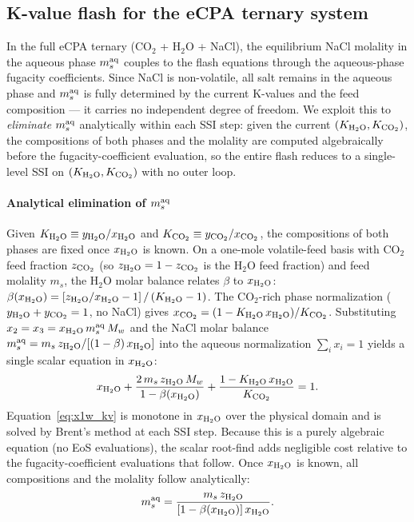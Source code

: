 \documentclass[preprint,12pt,number]{elsarticle}
\begin{document}
\subsection{K-value flash for the eCPA ternary system}
\label{sec:kv_flash}

In the full eCPA ternary (CO$_2$ + H$_2$O + NaCl), the equilibrium NaCl molality
in the aqueous phase $m_s^{\rm aq}$ couples to the flash equations through the
aqueous-phase fugacity coefficients.
Since NaCl is non-volatile, all salt remains in the aqueous phase and
$m_s^{\rm aq}$ is fully determined by the current K-values and the feed
composition — it carries no independent degree of freedom.
We exploit this to \emph{eliminate} $m_s^{\rm aq}$ analytically within each
SSI step: given the current $(K_{\rm H_2O}, K_{\rm CO_2})$, the compositions of both phases and
the molality are computed algebraically before the fugacity-coefficient
evaluation, so the entire flash reduces to a single-level SSI on $(K_{\rm H_2O}, K_{\rm CO_2})$
with no outer loop.

\paragraph{Analytical elimination of $m_s^{\rm aq}$}
Given $K_{\rm H_2O} \equiv y_{\rm H_2O}/x_{\rm H_2O}$ and $K_{\rm CO_2} \equiv y_{\rm CO_2}/x_{\rm CO_2}$, the compositions
of both phases are fixed once $x_{\rm H_2O}$ is known.
On a one-mole volatile-feed basis with CO$_2$ feed fraction $z_{\rm CO_2}$ (so $z_{\rm H_2O} = 1 - z_{\rm CO_2}$
is the H$_2$O feed fraction) and feed molality $m_s$, the H$_2$O molar
balance relates $\beta$ to $x_{\rm H_2O}$:
$\beta(x_{\rm H_2O}) = [z_{\rm H_2O}/x_{\rm H_2O} - 1]\,/\,(K_{\rm H_2O} - 1)$.
The CO$_2$-rich phase normalization ($y_{\rm H_2O} + y_{\rm CO_2} = 1$, no NaCl) gives
$x_{\rm CO_2} = (1 - K_{\rm H_2O}\,x_{\rm H_2O})/K_{\rm CO_2}$.
Substituting $x_2 = x_3 = x_{\rm H_2O}\,m_s^{\rm aq}\,M_w$ and the NaCl molar
balance $m_s^{\rm aq} = m_s\,z_{\rm H_2O}/[(1-\beta)\,x_{\rm H_2O}]$ into the aqueous
normalization $\sum_i x_i = 1$ yields a single scalar equation in
$x_{\rm H_2O}$:
\begin{equation}
  x_{\rm H_2O}
  + \frac{2\,m_s\,z_{\rm H_2O}\,M_w}{1 - \beta(x_{\rm H_2O})}
  + \frac{1 - K_{\rm H_2O}\,x_{\rm H_2O}}{K_{\rm CO_2}} = 1.
  \label{eq:x1w_kv}
\end{equation}
Equation~\eqref{eq:x1w_kv} is monotone in $x_{\rm H_2O}$ over the physical domain and is
solved by Brent's method at each SSI step.
Because this is a purely algebraic equation (no EoS evaluations), the scalar
root-find adds negligible cost relative to the fugacity-coefficient evaluations
that follow.
Once $x_{\rm H_2O}$ is known, all compositions and the molality follow analytically:
\begin{equation}
  m_s^{\rm aq} = \frac{m_s\,z_{\rm H_2O}}{[1-\beta(x_{\rm H_2O})]\,x_{\rm H_2O}}.
  \label{eq:msaq_kv}
\end{equation}
\end{document}
